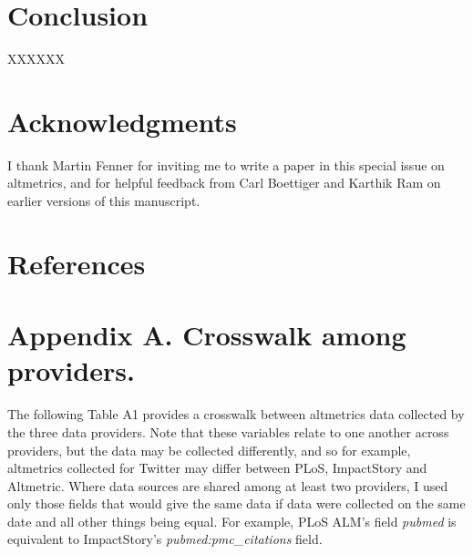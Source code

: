 \documentclass[letterpaper,superscriptaddress,showkeys,longbibliography]{revtex4-1}\usepackage{graphicx, color}
\begin{document}
\section*{Conclusion}

XXXXXX

\section*{Acknowledgments}

I thank Martin Fenner for inviting me to write a paper in this special issue on altmetrics, and for helpful feedback from Carl Boettiger and Karthik Ram on earlier versions of this manuscript.
  
\section*{References}


\section*{Appendix A. Crosswalk among providers.}

The following Table A1 provides a crosswalk between altmetrics data collected by the three data providers. Note that these variables relate to one another across providers, but the data may be collected differently, and so for example, altmetrics collected for Twitter may differ between PLoS, ImpactStory and Altmetric. Where data sources are shared among at least two providers, I used only those fields that would give the same data if data were collected on the same date and all other things being equal. For example, PLoS ALM's field \emph{pubmed} is equivalent to ImpactStory's \emph{pubmed:pmc\_citations} field.
\end{document}
